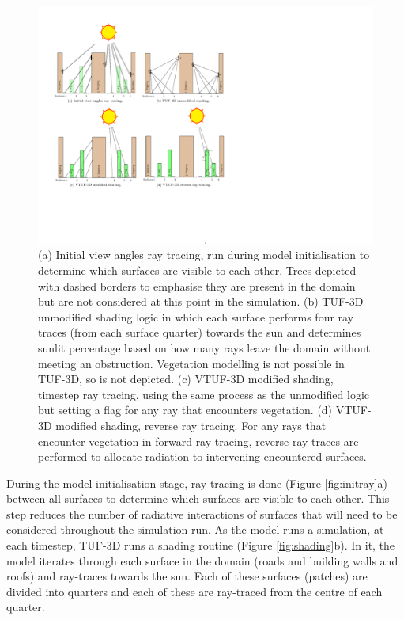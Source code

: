 \documentclass[final,3p,times,authoryear]{elsarticle}
\begin{document}
\begin{figure}[!htbp]
\includegraphics[trim = 15mm 50mm 132mm 15mm, clip, scale=0.75]{images/ModelDiagramsCombined2.pdf}
   \caption{(a) Initial view angles ray tracing, run during model initialisation to determine which surfaces are visible to each other. Trees depicted with dashed borders to emphasise they are present in the domain but are not considered at this point in the simulation. \label{fig:initray} (b) TUF-3D unmodified shading logic in which each surface performs four ray traces (from each surface quarter) towards the sun and determines sunlit percentage based on how many rays leave the domain without meeting an obstruction. Vegetation modelling is not possible in TUF-3D, so is not depicted. \label{fig:shading} (c) VTUF-3D modified shading, timestep ray tracing, using the same process as the unmodified logic but setting a flag for any ray that encounters vegetation. \label{fig:modshading} (d) VTUF-3D modified shading, reverse ray tracing. For any rays that encounter vegetation in forward ray tracing, reverse ray traces are performed to allocate radiation to intervening encountered surfaces. \label{fig:modshadingreverse}} 
\end{figure}


During the model initialisation stage, ray tracing is done (Figure \ref{fig:initray}a) between all surfaces to determine which surfaces are visible to each other. This step reduces the number of radiative interactions of surfaces that will need to be considered throughout the simulation run. As the model runs a simulation, at each timestep, TUF-3D runs a shading routine (Figure \ref{fig:shading}b). In it, the model iterates through each surface in the domain (roads and building walls and roofs) and ray-traces towards the sun. Each of these surfaces (patches) are divided into quarters and each of these are ray-traced from the centre of each quarter. 
\end{document}
